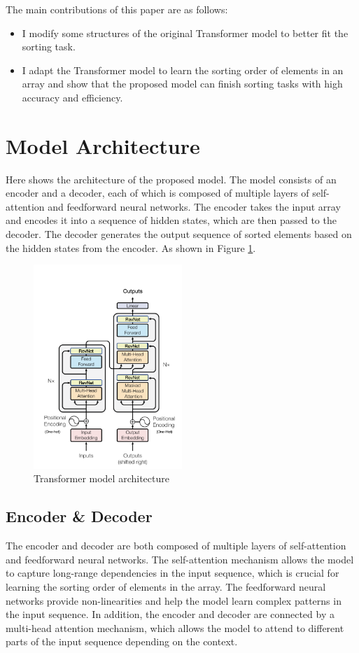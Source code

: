 \documentclass{article}
\begin{document}
The main contributions of this paper are as follows:
\begin{itemize}
    \item I modify some structures of the original Transformer model to better fit the sorting task.
    \item I adapt the Transformer model to learn the sorting order of elements in an array and show that the proposed model can finish sorting tasks with high accuracy and efficiency.
\end{itemize}


\section{Model Architecture}
Here shows the architecture of the proposed model. The model consists of an encoder and a decoder, each of which is composed of multiple layers of self-attention and feedforward neural networks. The encoder takes the input array and encodes it into a sequence of hidden states, which are then passed to the decoder. The decoder generates the output sequence of sorted elements based on the hidden states from the encoder. As shown in Figure \ref{Transformer model architecture}.

\begin{figure}
    \centering
    \includegraphics[width=0.5\textwidth]{picture/transformer.png}
    \caption{Transformer model architecture}
    \label{Transformer model architecture}
\end{figure}

\subsection{Encoder \& Decoder}
The encoder and decoder are both composed of multiple layers of self-attention and feedforward neural networks. The self-attention mechanism allows the model to capture long-range dependencies in the input sequence, which is crucial for learning the sorting order of elements in the array. The feedforward neural networks provide non-linearities and help the model learn complex patterns in the input sequence. In addition, the encoder and decoder are connected by a multi-head attention mechanism, which allows the model to attend to different parts of the input sequence depending on the context.
\end{document}
